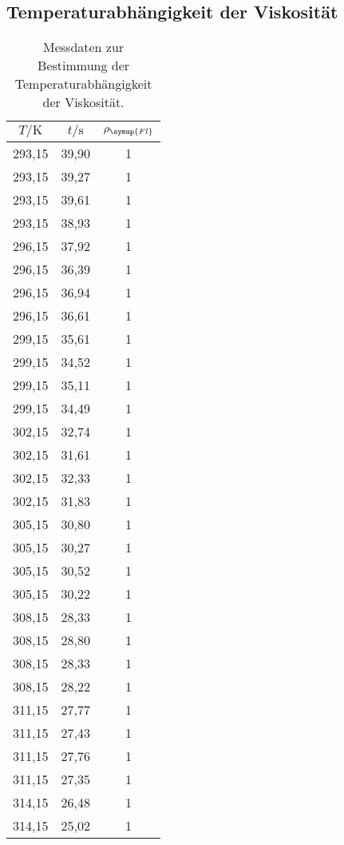 \subsection{Temperaturabhängigkeit der Viskosität}
\label{sec:TempVisk}

\begin{table}
  \centering
  \caption{Messdaten zur Bestimmung der Temperaturabhängigkeit der Viskosität.}
  \label{tab:Temp}
  \begin{tabular}{c c c}
    \toprule
    $T/\unit{\kelvin}$ & $t/\unit{\second}$ & $\rho_{\symup{Fl}}$ \\
    \midrule
    293,15 & 39,90 & 1 \\
    293,15 & 39,27 & 1 \\
    293,15 & 39,61 & 1 \\
    293,15 & 38,93 & 1 \\
    296,15 & 37,92 & 1 \\
    296,15 & 36,39 & 1 \\
    296,15 & 36,94 & 1 \\
    296,15 & 36,61 & 1 \\
    299,15 & 35,61 & 1 \\
    299,15 & 34,52 & 1 \\
    299,15 & 35,11 & 1 \\
    299,15 & 34,49 & 1 \\
    302,15 & 32,74 & 1 \\
    302,15 & 31,61 & 1 \\
    302,15 & 32,33 & 1 \\
    302,15 & 31,83 & 1 \\
    305,15 & 30,80 & 1 \\
    305,15 & 30,27 & 1 \\
    305,15 & 30,52 & 1 \\
    305,15 & 30,22 & 1 \\
    308,15 & 28,33 & 1 \\
    308,15 & 28,80 & 1 \\
    308,15 & 28,33 & 1 \\
    308,15 & 28,22 & 1 \\
    311,15 & 27,77 & 1 \\
    311,15 & 27,43 & 1 \\
    311,15 & 27,76 & 1 \\
    311,15 & 27,35 & 1 \\
    314,15 & 26,48 & 1 \\
    314,15 & 25,02 & 1 \\

\end{tabular}
\end{table}
